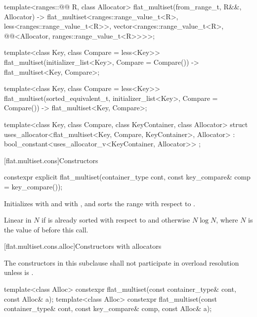\begin{codeblock}
{  template<ranges::@@ R, class Allocator>
    flat_multiset(from_range_t, R&&, Allocator)
      -> flat_multiset<ranges::range_value_t<R>, less<ranges::range_value_t<R>>,
                       vector<ranges::range_value_t<R>,
                              @@<Allocator, ranges::range_value_t<R>>>>;

  template<class Key, class Compare = less<Key>>
    flat_multiset(initializer_list<Key>, Compare = Compare())
      -> flat_multiset<Key, Compare>;

  template<class Key, class Compare = less<Key>>
  flat_multiset(sorted_equivalent_t, initializer_list<Key>, Compare = Compare())
      -> flat_multiset<Key, Compare>;

  template<class Key, class Compare, class KeyContainer, class Allocator>
    struct uses_allocator<flat_multiset<Key, Compare, KeyContainer>, Allocator>
      : bool_constant<uses_allocator_v<KeyContainer, Allocator>> { };
}
\end{codeblock}

[flat.multiset.cons]{Constructors}

%
\begin{itemdecl}
constexpr explicit flat_multiset(container_type cont, const key_compare& comp = key_compare());
\end{itemdecl}

\begin{itemdescr}
\pnum
\effects
Initializes  with  and
 with , and
sorts the range  with respect to .

\pnum
\complexity
Linear in $N$ if  is already sorted with respect to  and
otherwise $N \log N$, where $N$ is the value of  before this call.
\end{itemdescr}

[flat.multiset.cons.alloc]{Constructors with allocators}

\pnum
The constructors in this subclause shall not participate in overload resolution
unless  is .

%
\begin{itemdecl}
template<class Alloc>
  constexpr flat_multiset(const container_type& cont, const Alloc& a);
template<class Alloc>
  constexpr flat_multiset(const container_type& cont, const key_compare& comp, const Alloc& a);
\end{itemdecl}

